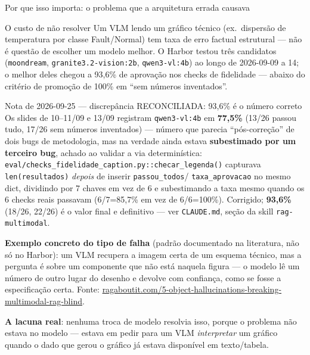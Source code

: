 \documentclass{beamer}
\newenvironment{numerobloco}[1]{\begin{block}{#1}}{\end{block}}
\begin{document}
\begin{frame}{Por que isso importa: o problema que a arquitetura errada causava}
  \small
  \begin{numerobloco}{O custo de não resolver}
    Um VLM lendo um gráfico técnico (ex.\ dispersão de temperatura por classe Fault/Normal)
    tem taxa de erro factual estrutural — não é questão de escolher um modelo melhor. O
    Harbor testou três candidatos (\texttt{moondream}, \texttt{granite3.2-vision:2b},
    \texttt{qwen3-vl:4b}) ao longo de 2026-09-09 a 14; o melhor deles chegou a 93,6\% de
    aprovação nos checks de fidelidade — abaixo do critério de promoção de 100\% em
    ``sem números inventados''.
  \end{numerobloco}

  \pause
  \begin{alertblock}{Nota de 2026-09-25 — discrepância RECONCILIADA: 93,6\% é o número correto}
    Os slides de 10--11/09 e 13/09 registram \texttt{qwen3-vl:4b} em \textbf{77,5\%}
    (13/26 passou tudo, 17/26 sem números inventados) — número que parecia
    ``pós-correção'' de dois bugs de metodologia, mas na verdade ainda estava
    \textbf{subestimado por um terceiro bug}, achado ao validar a via determinística:
    \texttt{eval/checks\_fidelidade\_caption.py::checar\_legenda()} capturava
    \texttt{len(resultados)} \emph{depois} de inserir \texttt{passou\_todos}/
    \texttt{taxa\_aprovacao} no mesmo dict, dividindo por 7 chaves em vez de 6 e
    subestimando a taxa mesmo quando os 6 checks reais passavam (6/7=85,7\% em vez de
    6/6=100\%). Corrigido; \textbf{93,6\%} (18/26, 22/26) é o valor final e definitivo —
    ver \texttt{CLAUDE.md}, seção da skill \texttt{rag-multimodal}.
  \end{alertblock}

  \pause
  \textbf{Exemplo concreto do tipo de falha} (padrão documentado na literatura, não só no
  Harbor): um VLM recupera a imagem certa de um esquema técnico, mas a pergunta é sobre um
  componente que não está naquela figura — o modelo lê um número de outro lugar do desenho e
  devolve com confiança, como se fosse a especificação certa. Fonte:
  \url{ragaboutit.com/5-object-hallucinations-breaking-multimodal-rag-blind}.

  \pause
  \textbf{A lacuna real}: nenhuma troca de modelo resolvia isso, porque o problema não estava
  no modelo — estava em pedir para um VLM \emph{interpretar} um gráfico quando o dado que
  gerou o gráfico já estava disponível em texto/tabela.
\end{frame}
\end{document}
